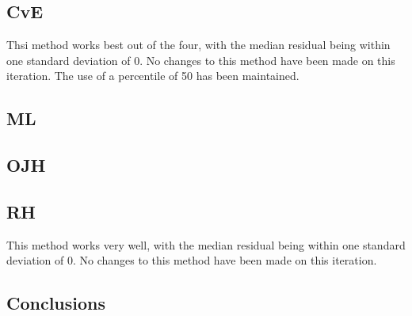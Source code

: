 \documentclass[10pt, a4paper]{article}
\begin{document}
\subsection{CvE}
Thsi method works best out of the four, with the median residual being within one standard deviation of 0. No changes to this method have been made on this iteration. The use of a percentile of 50 has been maintained.

\subsection{ML}
\subsection{OJH}
\subsection{RH}
This method works very well, with the median residual being within one standard deviation of 0. No changes to this method have been made on this iteration.

\subsection{Conclusions}
\end{document}
